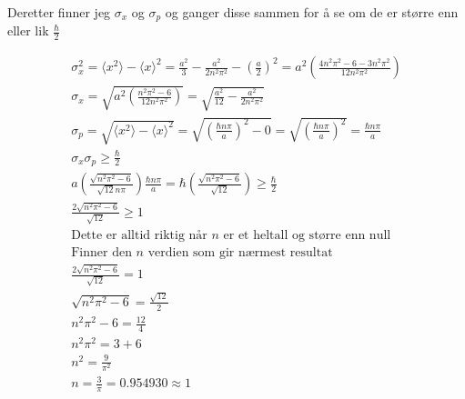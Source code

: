 \documentclass[11pt, A4paper,norsk]{article}
\begin{document}
			\begin{flushleft}
Deretter finner jeg $\sigma_x$ og $\sigma_p$ og ganger disse sammen for å se om de er større enn eller lik $\frac{\hbar}{2}$
			\end{flushleft}
			\begin{gather*}
\sigma_x^2 = \langle x^2 \rangle - \langle x \rangle^2 = \frac{a^2}{3} - \frac{a^2}{2 n^2 \pi^2} - \left( \frac{a}{2} \right)^2 = a^2 \left( \frac{4 n^2 \pi^2 - 6 - 3 n^2 \pi^2}{12 n^2 \pi^2} \right) \\
\sigma_x = \sqrt{a^2 \left( \frac{n^2 \pi^2 - 6}{12 n^2 \pi^2} \right)} = \sqrt{\frac{a^2}{12} - \frac{a^2}{2 n^2 \pi^2}} \\
\sigma_p = \sqrt{\langle x^2 \rangle - \langle x \rangle^2} = \sqrt{\left( \frac{\hbar n \pi}{a} \right)^2 - 0} = \sqrt{\left( \frac{\hbar n \pi}{a} \right)^2} = \frac{\hbar n \pi}{a} \\
\sigma_x \sigma_p \geq \frac{\hbar}{2} \\
a \left( \frac{\sqrt{n^2 \pi^2 - 6}}{\sqrt{12} n \pi} \right) \frac{\hbar n \pi}{a} = \hbar \left( \frac{\sqrt{n^2 \pi^2 - 6}}{\sqrt{12}} \right) \geq \frac{\hbar}{2} \\
\frac{2 \sqrt{n^2 \pi^2 - 6}}{\sqrt{12}} \geq 1 \\
\text{Dette er alltid riktig når $n$ er et heltall og større enn null} \\
\text{Finner den $n$ verdien som gir nærmest resultat} \\
\frac{2 \sqrt{n^2 \pi^2 - 6}}{\sqrt{12}} = 1 \\
\sqrt{n^2 \pi^2 - 6} = \frac{\sqrt{12}}{2} \\
n^2 \pi^2 - 6 = \frac{12}{4} \\
n^2 \pi^2 = 3 + 6 \\
n^2 = \frac{9}{\pi^2} \\
n = \frac{3}{\pi} = 0.954930 \approx 1
			\end{gather*}
\end{document}
